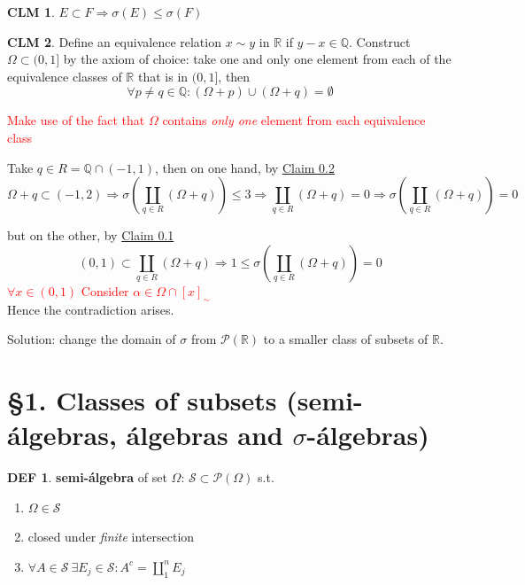 \documentclass[hidelinks]{article}
\theoremstyle{definition}
\newtheorem*{defin}{DEF}
\theoremstyle{dotless}
\newtheorem{claim}{CLM}[section]
\theoremstyle{remark}
\begin{document}
\begin{claim}\label{CLM 0.1}
$E\subset F\Rightarrow \sigma(E)\leq \sigma(F)$
\end{claim}

\begin{claim}\label{CLM 0.2}
Define an equivalence relation $x\sim y$ in $\mathbb{R}$ if $y-x\in \mathbb{Q}$. Construct $\Omega\subset (0,1]$ by the axiom of choice: take one and only one element from each of the equivalence classes of $\mathbb{R}$ that is in $(0,1]$, then
\[\forall p\neq q\in \mathbb{Q}:(\Omega+p)\cup(\Omega+q)=\emptyset\]
\end{claim}
\textcolor{red}{Make use of the fact that $\Omega$ contains \emph{only one} element from each equivalence class}\bigbreak

Take $q\in R=\mathbb{Q}\cap(-1,1)$, then on one hand, by \hyperref[CLM 0.2]{Claim 0.2}
\[\Omega +q\subset(-1,2)\Rightarrow\sigma(\coprod_{q\in R}(\Omega+q))\leq 3\Rightarrow\coprod_{q\in R}(\Omega+q)=0\Rightarrow\sigma(\coprod_{q\in R}(\Omega+q))=0\]

but on the other, by \hyperref[CLM 0.1]{Claim 0.1}
\[(0,1)\subset\coprod_{q\in R}(\Omega+q)\Rightarrow 1\leq\sigma(\coprod_{q\in R}(\Omega+q))=0\]
\textcolor{red}{$\forall x\in (0,1)$ Consider $\alpha\in\Omega\cap[x]_\sim$}\\
Hence the contradiction arises. \bigbreak

Solution: change the domain of $\sigma$ from $\mathscr{P}(\mathbb{R})$ to a smaller class of subsets of $\mathbb{R}$.

\bigbreak

\section*{\S1. Classes of subsets (semi-álgebras, álgebras and $\sigma$-álgebras)}
\setcounter{section}{1}

\begin{defin}
\textbf{semi-álgebra} of set $\Omega$: $\mathscr{S}\subset\mathscr{P}(\Omega)$ s.t.
\begin{enumerate}[label=\arabic*\degree]
    \item $\Omega\in\mathscr{S}$
    \item closed under \emph{finite} intersection
    \item $\forall A\in\mathscr{S}\ \exists E_j\in\mathscr{S}:A^c=\coprod\limits_1^nE_j$
\end{enumerate}
\end{defin}
\end{document}
